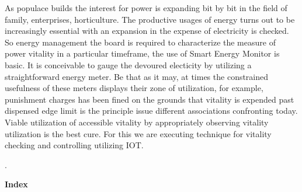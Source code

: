 \documentclass[12pt,a4paper]{article}
\begin{document}
As populace builds the interest for power is expanding bit by bit in the field of family, enterprises, horticulture. The productive usages of energy turns out to be increasingly essential with an expansion in the expense of electricity is checked.\\

So energy management the board is required to characterize the measure of power vitality in a particular timeframe, the use of Smart Energy Monitor is basic. It is conceivable to gauge the devoured electicity by utilizing a straightforward energy meter. Be that as it may, at times the constrained usefulness of these meters displays their zone of utilization, for example, punishment charges has been fined on the grounds that vitality is expended past dispensed edge limit is the principle issue different associations confronting today. Viable utilization of accessible vitality by appropriately observing vitality utilization is the best cure. For this we are executing technique for vitality checking and controlling utilizing IOT.



\newpage
\thispagestyle{empty}
.\\
\begin{center}
\textbf{\huge{Index}}\\
\end{center}

\tableofcontents
{}


\newpage
\thispagestyle{empty}
\thisfancypage{
   \setlength{\fboxsep}{10pt}\fbox}{} 

\listoftables
{}



\newpage
\thispagestyle{empty}
\thisfancypage{
   \setlength{\fboxsep}{10pt}\fbox}{} 

\listoffigures
{}

\end{document}
